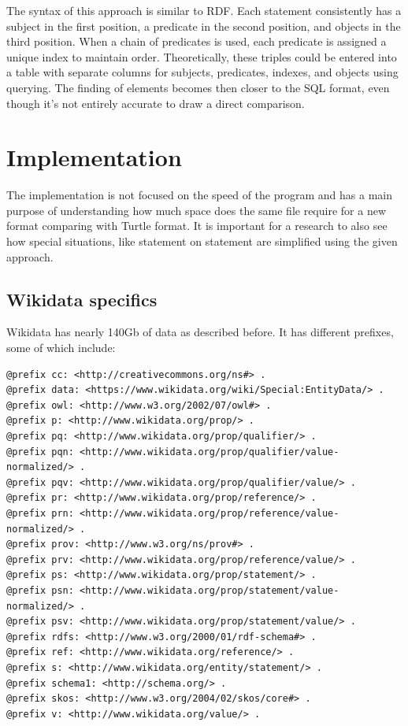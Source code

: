 
The syntax of this approach is similar to RDF. Each statement consistently has a subject in the first position, a predicate in the second position, and objects in the third position. When a chain of predicates is used, each predicate is assigned a unique index to maintain order. Theoretically, these triples could be entered into a table with separate columns for subjects, predicates, indexes, and objects using querying. The finding of elements becomes then closer to the SQL format, even though it’s not entirely accurate to draw a direct comparison.
\section{Implementation}

The implementation is not focused on the speed of the program and has a main purpose of understanding how much space does the same file require for a new format comparing with Turtle format. It is important for a research to also see how special situations, like statement on statement are simplified using the given approach.

\subsection{Wikidata specifics}
Wikidata has nearly 140Gb of data as described before. It has different prefixes, some of which include:

{\footnotesize
\begin{verbatim}
@prefix cc: <http://creativecommons.org/ns#> .
@prefix data: <https://www.wikidata.org/wiki/Special:EntityData/> .
@prefix owl: <http://www.w3.org/2002/07/owl#> .
@prefix p: <http://www.wikidata.org/prop/> .
@prefix pq: <http://www.wikidata.org/prop/qualifier/> .
@prefix pqn: <http://www.wikidata.org/prop/qualifier/value-normalized/> .
@prefix pqv: <http://www.wikidata.org/prop/qualifier/value/> .
@prefix pr: <http://www.wikidata.org/prop/reference/> .
@prefix prn: <http://www.wikidata.org/prop/reference/value-normalized/> .
@prefix prov: <http://www.w3.org/ns/prov#> .
@prefix prv: <http://www.wikidata.org/prop/reference/value/> .
@prefix ps: <http://www.wikidata.org/prop/statement/> .
@prefix psn: <http://www.wikidata.org/prop/statement/value-normalized/> .
@prefix psv: <http://www.wikidata.org/prop/statement/value/> .
@prefix rdfs: <http://www.w3.org/2000/01/rdf-schema#> .
@prefix ref: <http://www.wikidata.org/reference/> .
@prefix s: <http://www.wikidata.org/entity/statement/> .
@prefix schema1: <http://schema.org/> .
@prefix skos: <http://www.w3.org/2004/02/skos/core#> .
@prefix v: <http://www.wikidata.org/value/> .
\end{verbatim}
}

